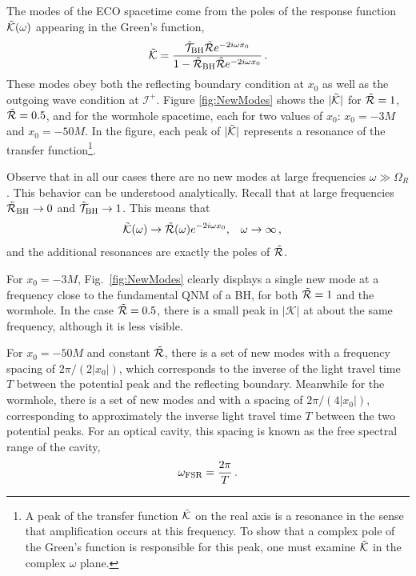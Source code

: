 \begin{refsection}
The modes of the ECO spacetime come from the poles of the response function $\tilde{\mathcal K}(\omega)$ appearing in the Green's function,
\begin{align}
\tilde{\mathcal K} = \frac{\tilde{\mathcal T}_{\rm BH} \tilde{\mathcal R} e^{-2i\omega x_0}} {1 - \tilde{\mathcal R}_{\rm BH} \tilde{\mathcal R} e^{-2i \omega x_0} } \,. \notag
\end{align}
These modes obey both the reflecting boundary condition at $x_0$ as well as the outgoing wave condition at $\mathcal I^+$.
Figure \ref{fig:NewModes} shows the $|\tilde{\mathcal K}|$ for $\tilde{\mathcal R} =1$, $\tilde{\mathcal R} =0.5$, and for the wormhole spacetime, each for two values of $x_0$: $x_0 = -3 M$ and $x_0 = -50 M$.
In the figure, each peak of $|\tilde{\mathcal K}|$ represents a resonance of the transfer function\footnote{
A peak of the transfer function $\tilde{\mathcal K}$ on the real axis is a resonance in the sense that amplification occurs at this frequency. To show that a complex pole of the Green's function is responsible for this peak, one must examine $\tilde{\mathcal K}$ in the complex $\omega$ plane.
}.

Observe that in all our cases there are no new modes at large frequencies $\omega \gg \Omega_R$.
This behavior can be understood analytically. Recall that at large frequencies $\tilde{\mathcal R}_{\rm BH}\to 0$ and $\tilde{\mathcal T}_{\rm BH} \to 1$. 
This means that
\begin{align}
&\tilde{\mathcal K}(\omega)\to \tilde{\mathcal R}(\omega)e^{-2i\omega x_0},& &\omega \to \infty \,,
\end{align}
and the additional resonances are exactly the poles of $\tilde{\mathcal R}$.

For $x_0=-3M$, Fig.~\ref{fig:NewModes} clearly displays a single new mode at a frequency close to the fundamental QNM of a BH, for both $\tilde{\mathcal R} = 1$ and the wormhole.
In the case $\tilde{\mathcal R}=0.5$, there is a small peak in $|\mathcal K|$ at about the same frequency, although it is less visible. 
 
For $x_0=-50M$ and constant $\tilde{\mathcal R}$, there is a set of new modes with a frequency spacing of $2\pi/(2|x_0|)$, which corresponds to the inverse of the light travel time $T$ between the potential peak and the reflecting boundary. 
Meanwhile for the wormhole, there is a set of new modes and with a spacing of $2\pi/(4|x_0|)$, corresponding to approximately the inverse light travel time $T$ between the two potential peaks.
For an optical cavity, this spacing is known as the free spectral range of the cavity, 
\begin{align}
\omega_{\rm FSR} = \frac{2\pi}{T} \,.
\end{align}


\end{refsection}
